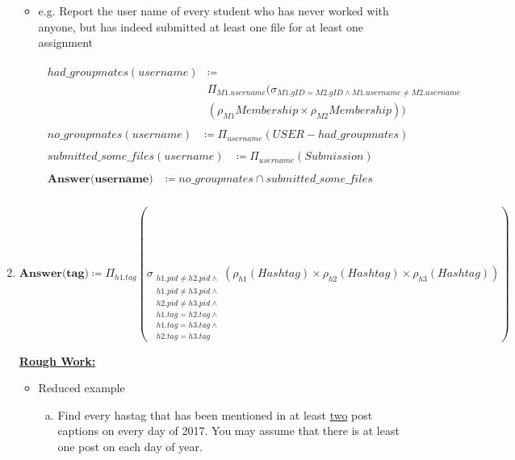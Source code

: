 \documentclass[12pt]{article}
\begin{document}
\begin{enumerate}[1.]
\begin{itemize}
        \item e.g. Report the user name of every student who has never worked with
        anyone, but has indeed submitted at least one file for at least one assignment

        \bigskip

        \begin{align*}
            \begin{split}
            had\_groupmates(username) &\coloneqq\\
            &\Pi_{M1.username}(\sigma_{M1.gID=M2.gID \land M1.username \neq M2.username}\\
            &(\rho_{M1}Membership \times \rho_{M2}Membership))
            \end{split}\\[1em]
            \begin{split}
            no\_groupmates(username) &\coloneqq \Pi_{username}(USER - had\_groupmates)
            \end{split}\\[1em]
            \begin{split}
            submitted\_some\_files(username) &\coloneqq \Pi_{username}(Submission)
            \end{split}\\[1em]
            \begin{split}
            \textbf{Answer(username)} &\coloneqq no\_groupmates \cap submitted\_some\_files
        \end{split}\\
        \end{align*}
    \end{itemize}

    \item

    $\textbf{Answer(tag)} \coloneqq \Pi_{h1.tag}(\sigma_{\substack{h1.pid \neq h2.pid \land
    \\ h1.pid \neq h3.pid \land \\ h2.pid \neq h3.pid \land \\ h1.tag = h2.tag \land \\ h1.tag = h3.tag \land \\ h2.tag = h3.tag}} (\rho_{h1}(Hashtag) \times \rho_{h2}(Hashtag) \times \rho_{h3}(Hashtag)))$

    \bigskip

    \underline{\textbf{Rough Work:}}

    \bigskip

    \begin{itemize}
        \item Reduced example
        \begin{enumerate} [a)]
            \item Find every hastag that has been mentioned in at least \underline{two}
            post captions on every day of 2017. You may assume that there is at least
            one post on each day of year.


\end{enumerate}
\end{itemize}
\end{enumerate}
\end{document}
